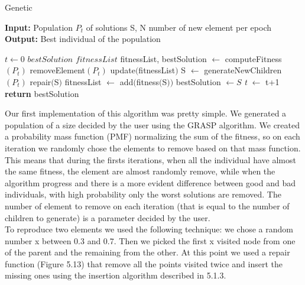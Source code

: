 \begin{algorithm}
	\caption{Genetic}\label{Genetic method}
	\hspace*{\algorithmicindent} \textbf{Input:} Population $P_t$ of solutions S, N number of new element per epoch \\
	\hspace*{\algorithmicindent} \textbf{Output:} Best individual of the population
    \begin{algorithmic}[1]
    		\State $\textit{t} \leftarrow 0$
    		\State $\textit{bestSolution}$
    		\State $\textit{fitnessList}$
    		\State fitnessList, bestSolution $\leftarrow$ computeFitness$(P_t)$ 
    				\State removeElement$(P_t)$
    				\State update$($fitnessList$)$
    			\EndFor
    				\State S $\leftarrow$ generateNewChildren$(P_t)$
    				\State repair$($S$)$
    				\State fitnessList $\leftarrow$ add$($fitness$($S$))$
    					\State bestSolution $\leftarrow S$
    				\EndIf
    			\EndFor
    			\State \textit{t} $\leftarrow$ t+1
    		\EndWhile
    		\State \textbf{return} bestSolution 
    \end{algorithmic}
\end{algorithm}


\noindent Our first implementation of this algorithm was pretty simple. We generated a population of a size decided by the user using the GRASP algorithm. We created a probability mass function (PMF) normalizing the sum of the fitness, so on each iteration we randomly chose the elements to remove based on that mass function. This means that during the firsts iterations, when all the individual have almost the same fitness, the element are almost randomly remove, while when the algorithm progress and there is a more evident difference between good and bad individuals, with high probability only the worst solutions are removed. The number of element to remove on each iteration (that is equal to the number of children to generate) is a parameter decided by the user. \\
To reproduce two elements we used the following technique: we chose a random number x between 0.3 and 0.7. Then we picked the first x visited node from one of the parent and the remaining from the other. At this point we used a repair function (Figure 5.13) that remove all the points visited twice and insert the missing ones using the insertion algorithm described in 5.1.3. 

